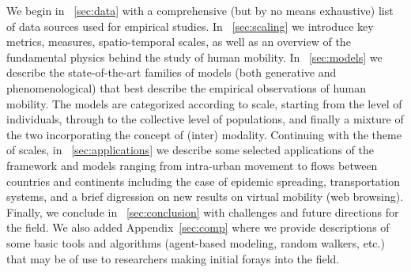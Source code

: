 We begin in \sectionname~\ref{sec:data} with a comprehensive (but by no means exhaustive) list of data sources used for empirical studies. In \sectionname~\ref{sec:scaling} we introduce key metrics, measures, spatio-temporal scales, as well as an overview of the fundamental physics behind the study of human mobility.  In \sectionname~\ref{sec:models} we describe the state-of-the-art families of models (both generative and phenomenological)  that best describe the empirical observations of human mobility. The models are categorized according to scale, starting from the level of individuals, through to the collective level of populations, and finally a mixture of the two incorporating the concept of (inter) modality.  Continuing with the theme of scales, in \sectionname~\ref{sec:applications} we describe some selected applications of the framework and models ranging from intra-urban movement to flows between countries and continents including the case of epidemic spreading, transportation systems, and a brief digression on new results on virtual mobility (web browsing). Finally, we conclude in \sectionname~\ref{sec:conclusion} with challenges and future directions for the field. We also added Appendix~\ref{sec:comp} where we provide descriptions of some basic tools and algorithms (agent-based modeling, random walkers, etc.) that may be of use to researchers making initial forays into the field.




